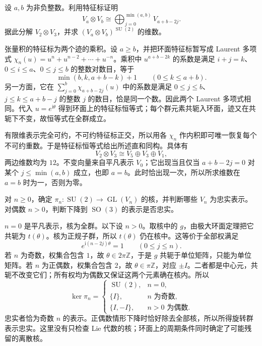 \begin{exercise}\label{g1:ex:su2-tensor-decomposition}
	设 \(a,b\) 为非负整数。利用特征标证明
	\[
		V_a\otimes V_b\cong\bigoplus_{j=0}^{\min(a,b)}V_{a+b-2j}.
	\]
	据此分解 \(V_2\otimes V_3\)，并求 \((V_a\otimes V_b)^{\operatorname{SU}(2)}\) 的维数。
\end{exercise}
\begin{solution}
	张量积的特征标为两个迹的乘积。设 \(a\ge b\)，并把环面特征标暂写成 Laurent 多项式 \(\chi_n(u)=u^n+u^{n-2}+\cdots+u^{-n}\)。乘积中 \(u^{a+b-2k}\) 的系数是满足 \(i+j=k\)、\(0\le i\le a\)、\(0\le j\le b\) 的整数对数目，等于
	\[
		\min(b,k,a+b-k)+1\qquad(0\le k\le a+b).
	\]
	另一方面，它在 \(\sum_{j=0}^b\chi_{a+b-2j}(u)\) 中的系数是满足 \(0\le j\le b\)、\(j\le k\le a+b-j\) 的整数 \(j\) 的数目，恰是同一个数。因此两个 Laurent 多项式相同。代入 \(u=e^{\mathrm{i}\theta}\) 得到环面上的特征标恒等式；每个群元素共轭入环面，迹又在共轭下不变，故恒等式在全群成立。

	有限维表示完全可约，不可约特征标正交，所以用各 \(\chi_n\) 作内积即可唯一恢复每个不可约重数。于是特征标恒等式给出所述直和同构。具体有
	\[
		V_2\otimes V_3\cong V_5\oplus V_3\oplus V_1,
	\]
	两边维数均为 \(12\)。不变向量来自平凡表示 \(V_0\)；它出现当且仅当 \(a+b-2j=0\) 对某个 \(j\le\min(a,b)\) 成立，也即 \(a=b\)。此时恰出现一次，所以所求维数在 \(a=b\) 时为一，否则为零。
\end{solution}

\begin{exercise}\label{g1:ex:su2-polynomial-kernel}
	对 \(n\ge0\)，确定 \(\pi_n:\operatorname{SU}(2)\to\operatorname{GL}(V_n)\) 的核，并判断哪些 \(V_n\) 为忠实表示。对偶数 \(n>0\)，判断下降到 \(\operatorname{SO}(3)\) 的表示是否忠实。
\end{exercise}
\begin{solution}
	\(n=0\) 是平凡表示，核为全群。以下设 \(n>0\)。取核中的 \(g\)，由极大环面定理把它共轭为 \(t(\theta)\)。核为正规子群，所以 \(t(\theta)\) 仍在核中。这等价于全部权满足
	\[
		e^{\mathrm{i}(n-2j)\theta}=1\qquad(0\le j\le n).
	\]
	若 \(n\) 为奇数，权集合包含 \(1\)，故 \(\theta\in2\pi\mathbb Z\)，于是 \(g\) 共轭于单位矩阵，只能为单位矩阵。若 \(n\) 为正偶数，权集合包含 \(2\)，故 \(\theta\in\pi\mathbb Z\)，对应 \(\pm I\)。二者都是中心元，共轭不改变它们；所有权均为偶数又保证这两个元素确在核内。所以
	\[
		\ker\pi_n=\begin{cases}
			\operatorname{SU}(2),&n=0,\\
			\{I\},&n\text{ 为奇数},\\
			\{I,-I\},&n>0\text{ 为偶数}.
		\end{cases}
	\]
	忠实者恰为奇数 \(n\) 的表示。正偶数情形下降时恰好除去全部核，所以所得旋转群表示忠实。这里没有只检查 Lie 代数的核；环面上的周期条件同时确定了可能残留的离散核。
\end{solution}

